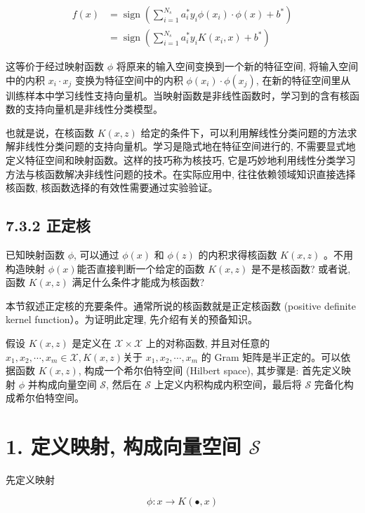 \documentclass[10pt]{article}
\begin{document}
\begin{align*}
f(x) & =\operatorname{sign}\left(\sum_{i=1}^{N_{s}} a_{i}^{*} y_{i} \phi\left(x_{i}\right) \cdot \phi(x)+b^{*}\right) \\
& =\operatorname{sign}\left(\sum_{i=1}^{N_{s}} a_{i}^{*} y_{i} K\left(x_{i}, x\right)+b^{*}\right) \tag{7.68}
\end{align*}


这等价于经过映射函数 $\phi$ 将原来的输入空间变换到一个新的特征空间, 将输入空间中的内积 $x_{i} \cdot x_{j}$ 变换为特征空间中的内积 $\phi\left(x_{i}\right) \cdot \phi\left(x_{j}\right)$, 在新的特征空间里从训练样本中学习线性支持向量机。当映射函数是非线性函数时，学习到的含有核函数的支持向量机是非线性分类模型。

也就是说，在核函数 $K(x, z)$ 给定的条件下，可以利用解线性分类问题的方法求解非线性分类问题的支持向量机。学习是隐式地在特征空间进行的, 不需要显式地定义特征空间和映射函数。这样的技巧称为核技巧, 它是巧妙地利用线性分类学习方法与核函数解决非线性问题的技术。在实际应用中, 往往依赖领域知识直接选择核函数, 核函数选择的有效性需要通过实验验证。

\subsection*{7.3.2 正定核}
已知映射函数 $\phi$, 可以通过 $\phi(x)$ 和 $\phi(z)$ 的内积求得核函数 $K(x, z)$ 。不用构造映射 $\phi(x)$能否直接判断一个给定的函数 $K(x, z)$ 是不是核函数? 或者说, 函数 $K(x, z)$ 满足什么条件才能成为核函数?

本节叙述正定核的充要条件。通常所说的核函数就是正定核函数 (positive definite kernel function）。为证明此定理, 先介绍有关的预备知识。

假设 $K(x, z)$ 是定义在 $\mathcal{X} \times \mathcal{X}$ 上的对称函数, 并且对任意的 $x_{1}, x_{2}, \cdots, x_{m} \in \mathcal{X}, K(x, z)$关于 $x_{1}, x_{2}, \cdots, x_{m}$ 的 Gram 矩阵是半正定的。可以依据函数 $K(x, z)$, 构成一个希尔伯特空间 (Hilbert space), 其步骤是: 首先定义映射 $\phi$ 并构成向量空间 $\mathcal{S}$, 然后在 $\mathcal{S}$ 上定义内积构成内积空间，最后将 $\mathcal{S}$ 完备化构成希尔伯特空间。

\section*{1. 定义映射, 构成向量空间 $\mathcal{S}$}
先定义映射


\begin{equation*}
\phi: x \rightarrow K(\bullet, x) \tag{7.69}
\end{equation*}
\end{document}
